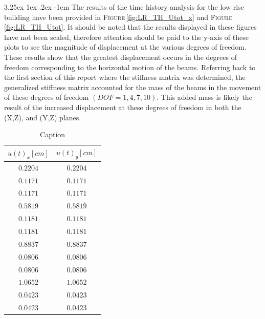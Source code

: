 \documentclass[11pt,a4paper,titlepage]{report}
\makeatletter
\renewcommand\paragraph{\@startsection{paragraph}{5}{\z@}%
  {3.25ex \@plus1ex \@minus.2ex}%
  {-1em}%
  {\normalfont\normalsize\bfseries}}
\makeatother
\begin{document}
\paragraph{}The results of the time history analysis for the low rise building have been provided in \textsc{Figure}\,\ref{fig:LR_TH_Utot_x} and \textsc{Figure}\,\ref{fig:LR_TH_Utot}. It should be noted that the results displayed in these figures have not been scaled, therefore attention should be paid to the y-axis of these plots to see the magnitude of displacement at the various degrees of freedom. These results show that the greatest displacement occurs in the degrees of freedom corresponding to the horizontal motion of the beams. Referring back to the first section of this report where the stiffness matrix was determined, the generalized stiffness matrix accounted for the mass of the beams in the movement of these degrees of freedom $(DOF=1,4,7,10)$. This added mass is likely the result of the increased displacement at these degrees of freedom in both the (X,Z), and (Y,Z) planes.
\begin{table}[]
    \centering
    \begin{tabular}{c|c}
      $u(t)_x [cm]$   & $u(t)_y [cm]$  \\
         \hline
        $0.2204$ & $0.2204$ \\
        $0.1171$ & $0.1171$ \\
        $0.1171$ & $0.1171$ \\
        $0.5819$ & $0.5819$ \\
        $0.1181$ & $0.1181$ \\
        $0.1181$ & $0.1181$ \\
        $0.8837$ & $0.8837$ \\
        $0.0806$ & $0.0806$ \\
        $0.0806$ & $0.0806$ \\
        $1.0652$ & $1.0652$ \\
        $0.0423$ & $0.0423$ \\
        $0.0423$ & $0.0423$ \\
    \end{tabular}
    \caption{Caption}
    \label{tab:my_label}
\end{table}
\newpage
\end{document}
